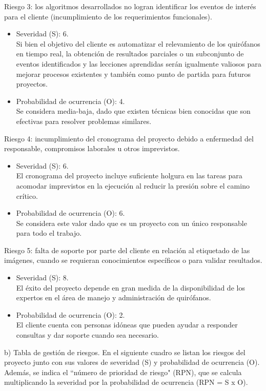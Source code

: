 \documentclass[
11pt, %
]{charter}
\begin{document}
Riesgo 3: los algoritmos desarrollados no logran identificar los eventos de interés para el cliente (incumplimiento de los requerimientos funcionales).
\begin{itemize}
	\item Severidad (S): 6. \\
	Si bien el objetivo del cliente es automatizar el relevamiento de los quirófanos en tiempo real, la obtención de resultados parciales o un subconjunto de eventos identificados y las lecciones aprendidas serán igualmente valiosos para mejorar procesos existentes y también como punto de partida para futuros proyectos. 
	\item Probabilidad de ocurrencia (O): 4. \\
	Se considera media-baja, dado que existen técnicas bien conocidas que son efectivas para resolver problemas similares.
\end{itemize}

Riesgo 4: incumplimiento del cronograma del proyecto debido a enfermedad del responsable, compromisos laborales u otros imprevistos.
\begin{itemize}
	\item Severidad (S): 6.\\
	El cronograma del proyecto incluye suficiente holgura en las tareas para acomodar imprevistos en la ejecución al reducir la presión sobre el camino crítico.
	\item Probabilidad de ocurrencia (O): 6.\\
	Se considera este valor dado que es un proyecto con un único responsable para todo el trabajo.  
\end{itemize}   

Riesgo 5: falta de soporte por parte del cliente en relación al etiquetado de las imágenes, cuando se requieran conocimientos específicos o para validar resultados.
\begin{itemize}
	\item Severidad (S): 8.\\
	El éxito del proyecto depende en gran medida de la disponibilidad de los expertos en el área de manejo y administración de quirófanos. 
	\item Probabilidad de ocurrencia (O): 2.\\
	El cliente cuenta con personas idóneas que pueden ayudar a responder consultas y dar soporte cuando sea necesario. 
\end{itemize}   



b) Tabla de gestión de riesgos.
En el siguiente cuadro se listan los riesgos del proyecto junto con sus valores de severidad (S) y probabilidad de ocurrencia (O). Además, se indica el ``número de prioridad de riesgo" (RPN), que se calcula multiplicando la severidad por la probabilidad de ocurrencia (RPN = S x O).
\end{document}
